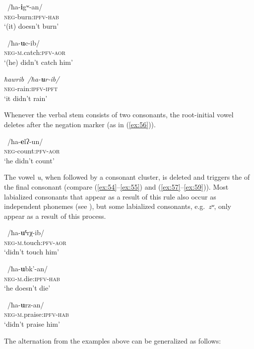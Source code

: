 \documentclass[output=paper]{langsci/langscibook}
\begin{document}
\ex \label{ex:53} %
~/{ħa-\textbf{i}gʷ-an}/\\
\textsc{neg}-burn:\textsc{ipfv}-\textsc{hab}\\
\glt `(it) doesn't burn'

\ex \label{ex:54} %
~/{ħa-\textbf{u}c-ib/}\\
\textsc{neg}-\textsc{m}.catch:\textsc{pfv}-\textsc{aor}\\
\glt `(he) didn't catch him'

\ex \label{ex:55} %
\emph{ħawrib~/ħa-\textbf{u}r-ib/}\\
\textsc{neg}-rain:\textsc{ipfv}-\textsc{ipft}\\
\glt  `it didn't rain'

\z

Whenever the verbal stem consists of two consonants, the root-initial
vowel deletes after the negation marker (as in (\ref{ex:56})).

\ea \label{ex:56} %
~/{ħa-\textbf{e}lʔ-un}/\\
\textsc{neg}-count:\textsc{pfv}-\textsc{aor}\\
\glt `he didn't count'
\z

The vowel \emph{u}, when followed by a consonant cluster, is deleted and
triggers the  of the final consonant (compare (\ref{ex:54}–\ref{ex:55}) and
(\ref{ex:57}–\ref{ex:59})). Most labialized consonants that appear as a result of this
rule also occur as independent phonemes (see ), but some
labialized consonants, e.g.\ \emph{zʷ}, only appear as a result of this
process.

\ea \label{ex:57} %
~/{ħa-\textbf{uˤ}rχ-ib}/\\
\textsc{neg}-\textsc{m}.touch:\textsc{pfv}-\textsc{aor}\\
\glt `didn't touch him'

\ex \label{ex:58} %
~/{ħa-\textbf{u}bk'-an}/\\
\textsc{neg}-\textsc{m}.die:\textsc{ipfv}-\textsc{hab}\\
\glt `he doesn't die'

\ex \label{ex:59} %
~/{ħa-\textbf{u}rz-an}/\\
\textsc{neg}-\textsc{m}.praise:\textsc{ipfv}-\textsc{hab}\\
\glt `didn't praise him'

\z

The alternation from the examples above can be generalized as follows:
\end{document}
